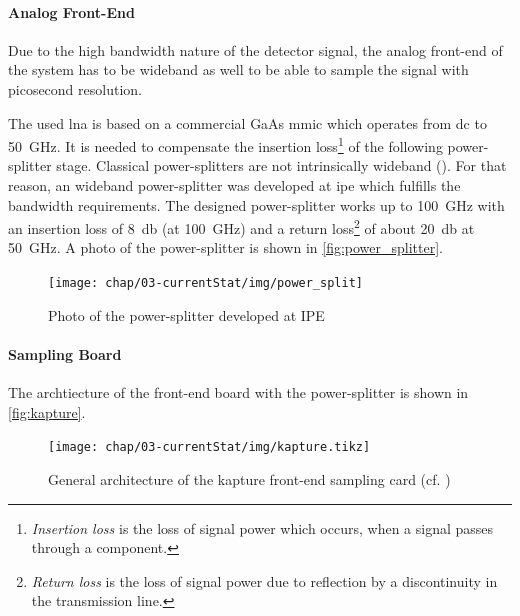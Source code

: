 \paragraph{Analog Front-End}
Due to the high bandwidth nature of the detector signal, the analog front-end of the system has to be wideband as well to be able to sample the signal with picosecond resolution. 

The used \gls{lna} is based on a commercial GaAs \gls{mmic} which operates from \gls{dc} to \SI{50}{\giga \hertz}. 
It is needed to compensate the insertion loss\footnote{\textit{Insertion loss} is the loss of signal power which occurs, when a signal passes through a component.} of the following power-splitter stage. 
Classical power-splitters are not intrinsically wideband (\cite{caselle2014}). 
For that reason, an wideband power-splitter was developed at \gls{ipe} which fulfills the bandwidth requirements. 
The designed power-splitter works up to \SI{100}{\giga \hertz} with an insertion loss of \SI{8}{\decibel} (at \SI{100}{\GHz}) and a return loss\footnote{\textit{Return loss} is the loss of signal power due to reflection by a discontinuity in the transmission line.} of about \SI{20}{\decibel} at \SI{50}{\giga \hertz}. \cite{caselle2014}
A photo of the power-splitter is shown in \autoref{fig:power_splitter}.

\begin{figure}[tbh]
	\centering
	\texttt{[image: chap/03-currentStat/img/power\_split]}
	\caption{Photo of the power-splitter developed at IPE}
	\label{fig:power_splitter}
\end{figure}

\paragraph{Sampling Board}
The archtiecture of the front-end board with the power-splitter is shown in \autoref{fig:kapture}. 
\begin{figure}[tbh]
	\centering
	\texttt{[image: chap/03-currentStat/img/kapture.tikz]}
	\caption[General architecture of the KAPTURE system]{General architecture of the \Gls{kapture} front-end sampling card (cf. \cite[p.2]{caselleKAP})}
	\label{fig:kapture}
\end{figure}

